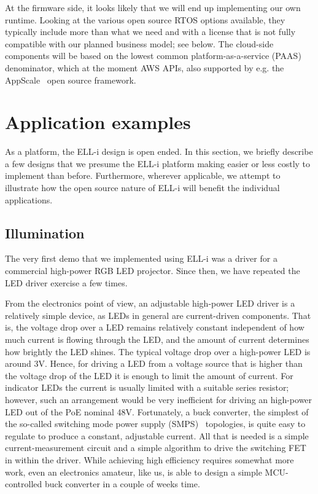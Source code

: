 \documentclass[final]{siamltex}
\begin{document}
At the firmware side, it looks likely that we will end up implementing
our own runtime.  Looking at the various open source RTOS options
available, they typically include more than what we need and with a
license that is not fully compatible with our planned business model;
see below.  The cloud-side components will be based on the lowest
common platform-as-a-service (PAAS) denominator, which at the moment
AWS APIs, also supported by
e.g. the AppScale~\cite{chohan2010appscale} open source framework.


\section{Application examples}
\label{sec:examples}

As a platform, the ELL-i design is open ended.  In this section, we
briefly describe a few designs that we presume the ELL-i platform
making easier or less costly to implement than before.  Furthermore,
wherever applicable, we attempt to illustrate how the open source
nature of ELL-i will benefit the individual applications.

\subsection{Illumination}

The very first demo that we implemented using ELL-i was a driver for a
commercial high-power RGB LED
projector.  Since then, we have repeated the LED driver exercise a few
times.

From the electronics point of view, an adjustable high-power LED driver is a
relatively simple device, as LEDs in general are current-driven
components.  That is, the voltage drop over a LED remains relatively
constant independent of how much current is flowing through the LED,
and the amount of current determines how brightly the LED shines.  The
typical voltage drop over a high-power LED is around 3V.  Hence, for driving a
LED from a voltage source that is higher than the voltage drop of the
LED it is enough to limit the amount of current.  For indicator LEDs
the current is usually limited with a suitable series resistor;
however, such an arrangement would be very inefficient for driving an
high-power LED out of the PoE nominal 48V.  Fortunately, a buck
converter, the simplest of the so-called
switching mode power supply (SMPS)~\cite{maniktala2012switching} topologies, 
is quite
easy to regulate to produce a constant, adjustable current.  All that
is needed is a simple current-measurement circuit and a simple
algorithm to drive the switching FET in within the driver.  While
achieving high efficiency requires somewhat more work, even an
electronics amateur, like us, is able to design a simple
MCU-controlled buck converter in a couple of weeks time.
\end{document}
